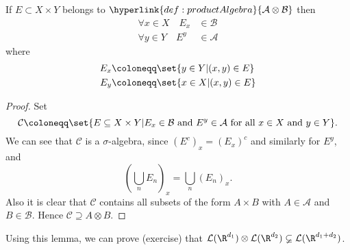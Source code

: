\documentclass{article}
\newcommand{\1}[1]{\mathbbm{1}_{#1}}
\begin{document}
\begin{lemma}
    If $E \subset X \times Y$ belongs to $\hyperlink{def:productAlgebra}{\mathcal{A} \otimes \mathcal{B}}$ then
    \begin{align*}
        \forall x \in X \quad E_x &\in \mathcal{B} \\
        \forall y \in Y \quad E^y &\in \mathcal{A}
    \end{align*}
    where
    \begin{align*}
        E_x &\coloneqq \set{y \in Y | (x, y) \in E} \\
        E_y &\coloneqq \set{x \in X | (x, y) \in E}
    \end{align*}
\end{lemma}

\begin{proof}
    Set
    \begin{equation*}
        \mathcal{C} \coloneqq \set{E \subseteq X \times Y | E_x \in \mathcal{B}\text{ and }E^y \in \mathcal{A} \text{ for all } x \in X \text{ and } y \in Y}.
    \end{equation*}
    We can see that $\mathcal{C}$ is a $\sigma$-algebra, since $(E^c)_x = (E_x)^c$ and similarly for $E^y$, and
    \begin{equation*}
        \left(\bigcup_n E_n\right)_x = \bigcup_n (E_n)_x.
    \end{equation*}
    Also it is clear that $\mathcal{C}$ contains all subsets of the form $A \times B$ with $A \in \mathcal{A}$ and $B \in \mathcal{B}$.
    Hence $\mathcal{C} \supseteq A \otimes B$.
\end{proof}

Using this lemma, we can prove (exercise) that $\mathcal{L}(\R^{d_1}) \otimes \mathcal{L}(\R^{d_2}) \varsubsetneq \mathcal{L}(\R^{d_1 + d_2})$.

\end{document}

